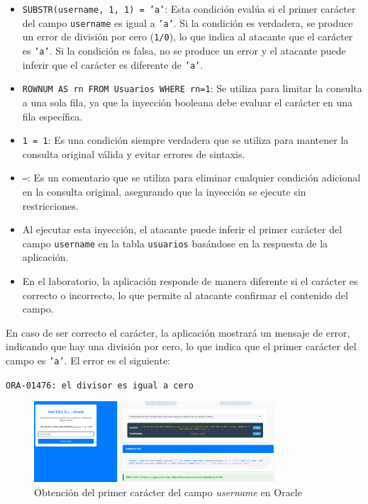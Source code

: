 \documentclass[a4paper,12pt]{article}
\begin{document}
\begin{itemize}
    \item \texttt{SUBSTR(username, 1, 1) = 'a'}: Esta condición evalúa si el primer carácter del campo \texttt{username} es igual a \texttt{'a'}. Si la condición es verdadera, se produce un error de división por cero (\texttt{1/0}), lo que indica al atacante que el carácter es \texttt{'a'}. Si la condición es falsa, no se produce un error y el atacante puede inferir que el carácter es diferente de \texttt{'a'}.
    \item \texttt{ROWNUM AS rn FROM Usuarios WHERE rn=1}: Se utiliza para limitar la consulta a una sola fila, ya que la inyección booleana debe evaluar el carácter en una fila específica.
    \item \texttt{1 = 1}: Es una condición siempre verdadera que se utiliza para mantener la consulta original válida y evitar errores de sintaxis.
    \item \texttt{--}: Es un comentario que se utiliza para eliminar cualquier condición adicional en la consulta original, asegurando que la inyección se ejecute sin restricciones.
    \item Al ejecutar esta inyección, el atacante puede inferir el primer carácter del campo \texttt{username} en la tabla \texttt{usuarios} basándose en la respuesta de la aplicación.
    \item En el laboratorio, la aplicación responde de manera diferente si el carácter es correcto o incorrecto, lo que permite al atacante confirmar el contenido del campo.

\end{itemize}

En caso de ser correcto el carácter, la aplicación mostrará un mensaje de error, indicando que hay una división por cero, lo que indica que el primer carácter del campo es \texttt{'a'}. El error es el siguiente:

\begin{center}
    \texttt{ORA-01476: el divisor es igual a cero}
    \end{center}

\begin{figure}[H]

    \centering
    \includegraphics[width=0.8\textwidth]{Imagenes/BooleanSQLICharCT.png}
    \caption{Obtención del primer carácter del campo \textit{username} en Oracle}
\end{figure}
\end{document}
